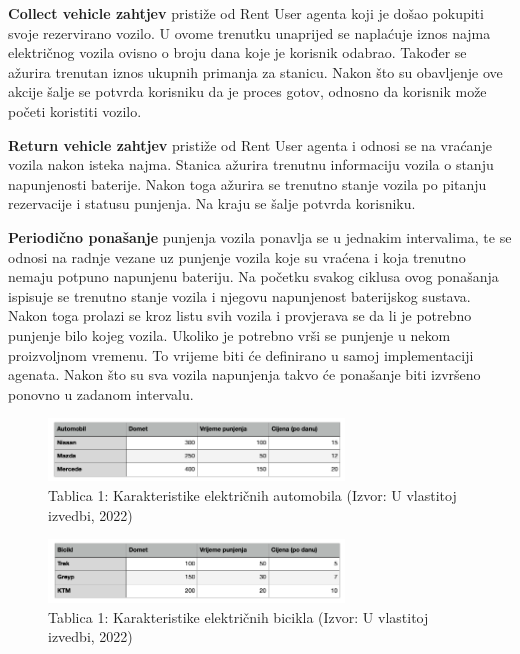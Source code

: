 \documentclass{foi}
\begin{document}
\textbf{Collect vehicle zahtjev} pristiže od Rent User agenta koji je došao pokupiti svoje rezervirano vozilo. U ovome trenutku unaprijed se naplaćuje iznos najma električnog vozila ovisno o broju dana koje je korisnik odabrao. Također se ažurira trenutan iznos ukupnih primanja za stanicu. Nakon što su obavljenje ove akcije šalje se potvrda korisniku da je proces gotov, odnosno da korisnik može početi koristiti vozilo.

\textbf{Return vehicle zahtjev} pristiže od Rent User agenta i odnosi se na vraćanje vozila nakon isteka najma. Stanica ažurira trenutnu informaciju vozila o stanju napunjenosti baterije. Nakon toga ažurira se trenutno stanje vozila po pitanju rezervacije i statusu punjenja. Na kraju se šalje potvrda korisniku.

\textbf{Periodično ponašanje} punjenja vozila ponavlja se u jednakim intervalima, te se odnosi na radnje vezane uz punjenje vozila koje su vraćena i koja trenutno nemaju potpuno napunjenu bateriju. Na početku svakog ciklusa ovog ponašanja ispisuje se trenutno stanje vozila i njegovu napunjenost baterijskog sustava. Nakon toga prolazi se kroz listu svih vozila i provjerava se da li je potrebno punjenje bilo kojeg vozila. Ukoliko je potrebno vrši se punjenje u nekom proizvoljnom vremenu. To vrijeme biti će definirano u samoj implementaciji agenata. Nakon što su sva vozila napunjenja takvo će ponašanje biti izvršeno ponovno u zadanom intervalu.

\begin{figure}[h!]
	\centering
	\includegraphics[width=0.7\textwidth]{slike/tablica1.png}
	\caption{Tablica 1: Karakteristike električnih automobila (Izvor: U vlastitoj izvedbi, 2022)}
\end{figure}

\begin{figure}[h!]
	\centering
	\includegraphics[width=0.7\textwidth]{slike/tablica2.png}
	\caption{Tablica 1: Karakteristike električnih bicikla (Izvor: U vlastitoj izvedbi, 2022)}
\end{figure}
\end{document}
